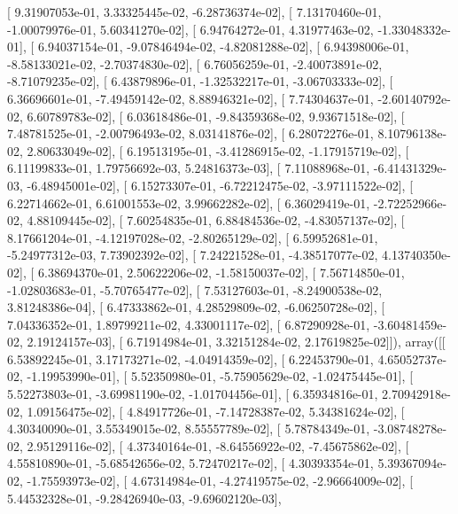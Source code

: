 \documentclass{article}
\begin{document}
       [  9.31907053e-01,   3.33325445e-02,  -6.28736374e-02],
       [  7.13170460e-01,  -1.00079976e-01,   5.60341270e-02],
       [  6.94764272e-01,   4.31977463e-02,  -1.33048332e-01],
       [  6.94037154e-01,  -9.07846494e-02,  -4.82081288e-02],
       [  6.94398006e-01,  -8.58133021e-02,  -2.70374830e-02],
       [  6.76056259e-01,  -2.40073891e-02,  -8.71079235e-02],
       [  6.43879896e-01,  -1.32532217e-01,  -3.06703333e-02],
       [  6.36696601e-01,  -7.49459142e-02,   8.88946321e-02],
       [  7.74304637e-01,  -2.60140792e-02,   6.60789783e-02],
       [  6.03618486e-01,  -9.84359368e-02,   9.93671518e-02],
       [  7.48781525e-01,  -2.00796493e-02,   8.03141876e-02],
       [  6.28072276e-01,   8.10796138e-02,   2.80633049e-02],
       [  6.19513195e-01,  -3.41286915e-02,  -1.17915719e-02],
       [  6.11199833e-01,   1.79756692e-03,   5.24816373e-03],
       [  7.11088968e-01,  -6.41431329e-03,  -6.48945001e-02],
       [  6.15273307e-01,  -6.72212475e-02,  -3.97111522e-02],
       [  6.22714662e-01,   6.61001553e-02,   3.99662282e-02],
       [  6.36029419e-01,  -2.72252966e-02,   4.88109445e-02],
       [  7.60254835e-01,   6.88484536e-02,  -4.83057137e-02],
       [  8.17661204e-01,  -4.12197028e-02,  -2.80265129e-02],
       [  6.59952681e-01,  -5.24977312e-03,   7.73902392e-02],
       [  7.24221528e-01,  -4.38517077e-02,   4.13740350e-02],
       [  6.38694370e-01,   2.50622206e-02,  -1.58150037e-02],
       [  7.56714850e-01,  -1.02803683e-01,  -5.70765477e-02],
       [  7.53127603e-01,  -8.24900538e-02,   3.81248386e-04],
       [  6.47333862e-01,   4.28529809e-02,  -6.06250728e-02],
       [  7.04336352e-01,   1.89799211e-02,   4.33001117e-02],
       [  6.87290928e-01,  -3.60481459e-02,   2.19124157e-03],
       [  6.71914984e-01,   3.32151284e-02,   2.17619825e-02]]), array([[  6.53892245e-01,   3.17173271e-02,  -4.04914359e-02],
       [  6.22453790e-01,   4.65052737e-02,  -1.19953990e-01],
       [  5.52350980e-01,  -5.75905629e-02,  -1.02475445e-01],
       [  5.52273803e-01,  -3.69981190e-02,  -1.01704456e-01],
       [  6.35934816e-01,   2.70942918e-02,   1.09156475e-02],
       [  4.84917726e-01,  -7.14728387e-02,   5.34381624e-02],
       [  4.30340090e-01,   3.55349015e-02,   8.55557789e-02],
       [  5.78784349e-01,  -3.08748278e-02,   2.95129116e-02],
       [  4.37340164e-01,  -8.64556922e-02,  -7.45675862e-02],
       [  4.55810890e-01,  -5.68542656e-02,   5.72470217e-02],
       [  4.30393354e-01,   5.39367094e-02,  -1.75593973e-02],
       [  4.67314984e-01,  -4.27419575e-02,  -2.96664009e-02],
       [  5.44532328e-01,  -9.28426940e-03,  -9.69602120e-03],
\end{document}
